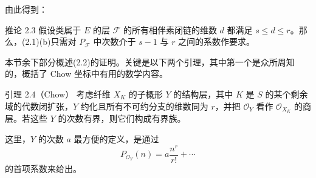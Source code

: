 由此得到：
\begin{statement}{推论 2.3}
假设类属于 $E$ 的层 $\mathcal F$ 的所有相伴素闭链的维数 $d$ 都满足 $s\leq d\leq r$。那么，(2.1)(b)只需对 $P_{\mathcal F}$ 中次数介于 $s-1$ 与 $r$ 之间的系数作要求。
\end{statement}
本节余下部分概述(2.2)的证明。关键是以下两个引理，其中第一个是众所周知的，概括了 Chow 坐标中有用的数学内容。

\begin{statement}{引理 2.4（Chow）}
考虑纤维 $X_K$ 的子概形 $Y$ 的结构层，其中 $K$ 是 $S$ 的某个剩余域的代数闭扩张，$Y$ 约化且所有不可约分支的维数同为 $r$，并把 $\mathcal O_Y$ 看作 $\mathcal O_{X_K}$ 的商层。若这些 $Y$ 的次数有界，则它们构成有界族。
\end{statement}
这里，$Y$ 的次数 $a$ 最方便的定义，是通过
\[
P_{\mathcal O_Y}(n)=a\frac{n^r}{r!}+\cdots
\]
的首项系数来给出。

